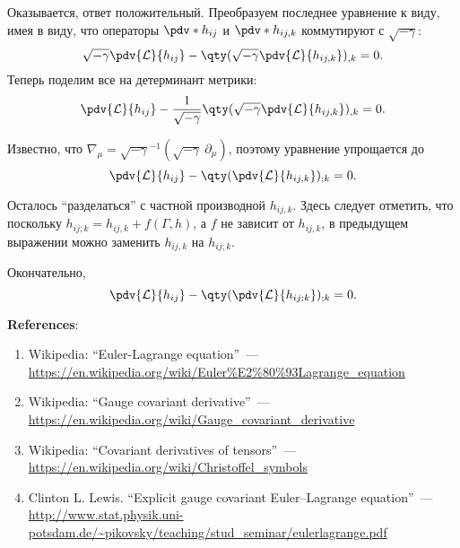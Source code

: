 \documentclass[\docroot/reports/draft/report.tex]{subfiles}
\begin{document}
    Оказывается, ответ положительный. Преобразуем последнее уравнение к виду, имея в виду, что операторы $\pdv*{h_{ij}}$ и $\pdv*{h_{ij,k}}$ коммутируют с $\sqrt{-\gamma}$:
    \begin{equation}
        \sqrt{-\gamma}\pdv{\mathcal{L}}{h_{ij}} - \qty(\sqrt{-\gamma}\pdv{\mathcal{L}}{h_{ij,k}})_{,k} = 0 .
    \end{equation}
    Теперь поделим все на детерминант метрики:
    \begin{equation}
        \pdv{\mathcal{L}}{h_{ij}} - \frac{1}{\sqrt{-\gamma}}\qty(\sqrt{-\gamma}\pdv{\mathcal{L}}{h_{ij,k}})_{,k} = 0 .
    \end{equation}

    Известно, что $\nabla_\mu = {\sqrt{-\gamma}}^{-1}(\sqrt{-\gamma}\ \partial_\mu)$, поэтому уравнение упрощается до
    \begin{equation}
        \pdv{\mathcal{L}}{h_{ij}} - \qty(\pdv{\mathcal{L}}{h_{ij,k}})_{;k} = 0 .
    \end{equation}

    Осталось \enquote{разделаться} с частной производной $h_{ij,k}$. Здесь следует отметить, что поскольку $h_{ij;k} = h_{ij,k} + f(\Gamma, h)$, а $f$ не зависит от $h_{ij,k}$, в предыдущем выражении можно заменить $h_{ij,k}$ на $h_{ij;k}$.

    Окончательно,
    \begin{equation}
        \pdv{\mathcal{L}}{h_{ij}} - \qty(\pdv{\mathcal{L}}{h_{ij;k}})_{;k} = 0 .
    \end{equation}

    \vspace{1cm}

    \textbf{\Large{References}}:
    \begin{enumerate}
        \item Wikipedia: \enquote{Euler-Lagrange equation}~--- \url{https://en.wikipedia.org/wiki/Euler%E2%80%93Lagrange_equation}
        \item Wikipedia: \enquote{Gauge covariant derivative}~--- \url{https://en.wikipedia.org/wiki/Gauge_covariant_derivative}
        \item Wikipedia: \enquote{Covariant derivatives of tensors}~--- \url{https://en.wikipedia.org/wiki/Christoffel_symbols}
        \item Clinton L. Lewis. \enquote{Explicit gauge covariant Euler–Lagrange equation}~--- \url{http://www.stat.physik.uni-potsdam.de/~pikovsky/teaching/stud_seminar/eulerlagrange.pdf}
    \end{enumerate}

\end{document}
